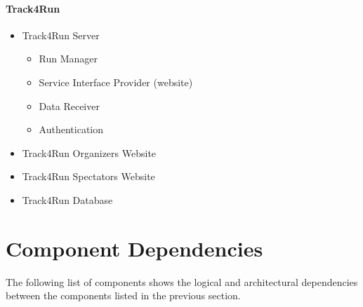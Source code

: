 \documentclass[../DD.tex]{subfiles}
\begin{document}
\paragraph{Track4Run}
\begin{itemize}
	\item{Track4Run Server}
	\begin{itemize}
		\item{Run Manager}
		\item{Service Interface Provider (website)}
		\item{Data Receiver}
		\item{Authentication}
	\end{itemize}
	\item{Track4Run Organizers Website}
	\item{Track4Run Spectators Website}
	\item{Track4Run Database}
\end{itemize}
\newpage
\section{Component Dependencies}
The following list of components shows the logical and architectural dependencies between the components listed in the previous section.
\end{document}
